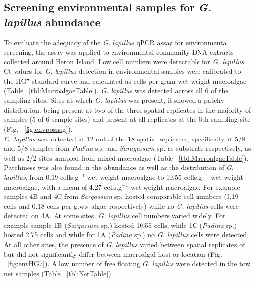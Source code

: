 \documentclass[12pt]{article}
\begin{document}
\subsection*{Screening environmental samples for \emph{G. lapillus} abundance }%
\FloatBarrier
To evaluate the adequacy of the \emph{G. lapillus} %
qPCR assay for environmental screening, the assay was applied to environmental community DNA extracts collected around Heron Island. 
Low cell numbers were detectable for \emph{G. lapillus}. 
Ct values for \emph{G. lapillus} detection in environmental samples were calibrated to the HG7 standard curve and calculated as cells per gram wet weight macroalgae (Table ~\ref{tbl:MacroalgaeTable}). 
\emph{G. lapillus} was detected across all 6 of the sampling sites. Sites at which \textit{G. lapillus} was present, it showed a patchy distribution, being present at two of the three spatial replicates in the majority of samples (5 of 6 sample sites) and present at all replicates at the 6th sampling site (Fig. ~\ref{fig:envposneg}). \\
\emph{G. lapillus} was detected at 12 out of the 18 spatial replicates, specifically at 5/8 and 5/8 samples from \emph{Padina} sp. and \emph{Saragassum} sp. as substrate respectively, as well as 2/2 sites sampled from mixed macroalgae (Table ~\ref{tbl:MacroalgaeTable}).
Patchiness was also found in the abundance as well as the distribution of \emph{G. lapillus}, from 0.19 cells.g$^{-1}$ wet weight macroalgae to 10.55 cells.g$^{-1}$ wet weight macroalgae, with a mean of 4.27 cells.g$^{-1}$ wet weight macroalgae. 
For example samples 4B and 4C from \emph{Sargassum} sp. hosted comparable cell numbers (0.19 cells and 0.18 cells per g.ww algae respectively) while no \emph{G. lapillus} cells were detected on 4A.
At some sites, \emph{G. lapillus} cell numbers varied widely. For example sample 1B (\emph{Sargassum} sp.) hosted 10.55 cells, while 1C (\textit{Padina} sp.) hosted 2.75 cells and while for 1A (\emph{Padina} sp.) no \emph{G. lapillus} cells were detected.
At all other sites, the presence of \textit{G. lapillus} varied between spatial replicates of but did not significantly differ between macroalgal host or location (Fig. ~\ref{fig:envHG7}). 
A low number of free floating \textit{G. lapillus} were detected in the tow net samples (Table ~\ref{tbl:NetTable})
\end{document}
